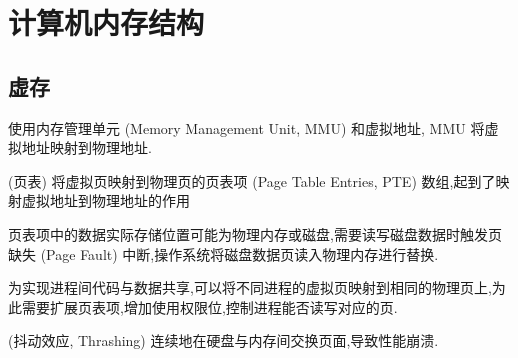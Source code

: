 
\usepackage{../../lectures_preamble}


    \section{计算机内存结构}
    \subsection{虚存}
    使用内存管理单元 (Memory Management Unit, MMU) 和虚拟地址, MMU 将虚拟地址映射到物理地址.

    \begin{definition}
        (页表) 将虚拟页映射到物理页的页表项 (Page Table Entries, PTE) 数组,起到了映射虚拟地址到物理地址的作用
    \end{definition}
    页表项中的数据实际存储位置可能为物理内存或磁盘,需要读写磁盘数据时触发页缺失 (Page Fault) 中断,操作系统将磁盘数据页读入物理内存进行替换.

    为实现进程间代码与数据共享,可以将不同进程的虚拟页映射到相同的物理页上,为此需要扩展页表项,增加使用权限位,控制进程能否读写对应的页.
    \begin{definition}
        (抖动效应, Thrashing) 连续地在硬盘与内存间交换页面,导致性能崩溃.
    \end{definition}
